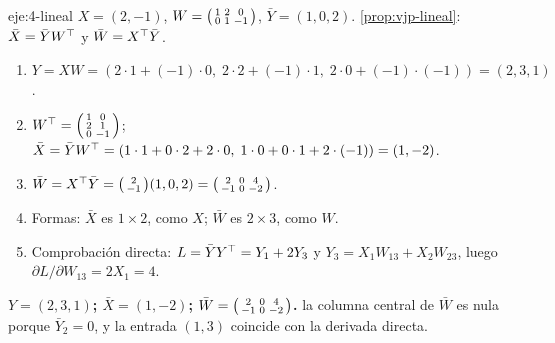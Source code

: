 \begin{solucion}{eje:4-lineal}
\datos $X=(2,-1)$, $W=\begin{psmallmatrix}1&2&0\\0&1&-1\end{psmallmatrix}$, $\bar Y=(1,0,2)$.
\planteamiento \cref{prop:vjp-lineal}: $\bar X=\bar YW^{\top}$ y $\bar W=X^{\top}\bar Y$.
\pasos
\begin{enumerate}[label=\arabic*.]
  \item $Y=XW=(2\cdot 1+(-1)\cdot 0,\;2\cdot 2+(-1)\cdot 1,\;2\cdot 0+(-1)\cdot(-1))=(2,3,1)$.
  \item $W^{\top}=\begin{psmallmatrix}1&0\\2&1\\0&-1\end{psmallmatrix}$; $\bar X=\bar YW^{\top}=(1\cdot 1+0\cdot 2+2\cdot 0,\;1\cdot 0+0\cdot 1+2\cdot(-1))=(1,-2)$.
  \item $\bar W=X^{\top}\bar Y=\begin{psmallmatrix}2\\-1\end{psmallmatrix}(1,0,2)=\begin{psmallmatrix}2&0&4\\-1&0&-2\end{psmallmatrix}$.
  \item Formas: $\bar X$ es $1\times 2$, como $X$; $\bar W$ es $2\times 3$, como $W$.
  \item Comprobación directa: $L=\bar YY^{\top}=Y_1+2Y_3$ y $Y_3=X_1W_{13}+X_2W_{23}$, luego $\partial L/\partial W_{13}=2X_1=4$.
\end{enumerate}
\resultado \textbf{$Y=(2,3,1)$; $\bar X=(1,-2)$; $\bar W=\begin{psmallmatrix}2&0&4\\-1&0&-2\end{psmallmatrix}$.}
\comprobacion la columna central de $\bar W$ es nula porque $\bar Y_2=0$, y la entrada $(1,3)$ coincide con la derivada directa.
\end{solucion}

